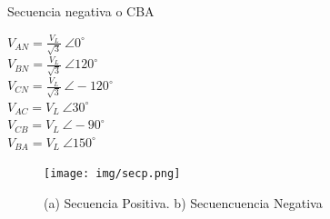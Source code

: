 \documentclass[10pt,a4paper]{article}
\begin{document}
\begin{enumerate}
Secuencia negativa o CBA

$V_{AN}= \frac{V_L}{\sqrt{3}}\ \angle 0^{\circ}  $    \\
$V_{BN}= \frac{V_L}{\sqrt{3}}\ \angle 120^{\circ}  $    \\
$V_{CN}= \frac{V_L}{\sqrt{3}}\ \angle -120^{\circ}  $  \\
$V_{AC} = V_L\ \angle 30^{\circ} $    \\
$V_{CB} = V_L\ \angle -90^{\circ}  $    \\
$V_{BA} = V_L\ \angle 150^{\circ} $    \\



\begin{figure}[H]
	\centering
	\texttt{[image: img/secp.png]}
	\caption{(a) Secuencia Positiva. b) Secuencuencia Negativa}
	\label{sec}
\end{figure}




    
\end{enumerate}
    
\end{document}
